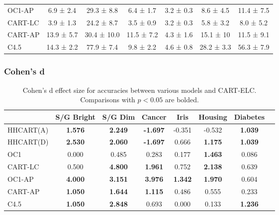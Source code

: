 \documentclass[10pt]{beamer}
\begin{document}
\begin{frame}
\begin{table}[h]
\begin{tabular}{lcccccc}
		OC1-AP    & 6.9 ± 2.4  & 29.3 ± 8.8  & 6.4 ± 1.7  & 3.2 ± 0.3  & 8.6 ± 4.5  & 11.4 ± 7.5  \\
		CART-LC   & 3.9 ± 1.3  & 24.2 ± 8.7  & 3.5 ± 0.9  & 3.2 ± 0.3  & 5.8 ± 3.2  & 8.0 ± 5.2  \\
		CART-AP   & 13.9 ± 5.7  & 30.4 ± 10.0  & 11.5 ± 7.2  & 4.3 ± 1.6  & 15.1 ± 10  & 11.5 ± 9.1  \\
		C4.5      & 14.3 ± 2.2  & 77.9 ± 7.4  & 9.8 ± 2.2  & 4.6 ± 0.8  & 28.2 ± 3.3  & 56.3 ± 7.9  \\ 
		\bottomrule
	\end{tabular}
	\label{fig:results}
\end{table}
\end{frame}

\begin{frame}
	\frametitle{Cohen's d}
	\tiny

\begin{table}[h]
	\centering
	\caption{Cohen's d effect size for accuracies between various models and CART-ELC. Comparisons with $p < 0.05$ are bolded.}
	\begin{tabular}{lccccccc} 
		\addlinespace
		\toprule
		\multirow{1}{*}{Algorithm} & \multirow{1}{*}{S/G Bright} & \multirow{1}{*}{S/G Dim} & \multirow{1}{*}{Cancer} & \multirow{1}{*}{Iris} & \multirow{1}{*}{Housing} & \multirow{1}{*}{Diabetes} \\ 
		\midrule

		HHCART(A) & \textbf{1.576} & \textbf{2.249} & \textbf{-1.697} & -0.351 & -0.532 & \textbf{1.039} \\
		HHCART(D) & \textbf{2.530} & \textbf{2.060} & \textbf{-1.697} & 0.666 & \textbf{1.175} & \textbf{1.039} \\
	OC1 & 0.000 & 0.485 & 0.283 & 0.177 & \textbf{1.463} & 0.086 \\
	CART-LC & 0.500 & \textbf{4.800} & \textbf{1.961} & 0.752 & \textbf{2.138} & 0.639 \\

	OC1-AP & \textbf{4.000} & \textbf{3.151} & \textbf{3.976} & \textbf{1.342} & \textbf{1.970} & 0.604 \\
	CART-AP & \textbf{1.050} & \textbf{1.644} & \textbf{1.115} & 0.486 & 0.555 & 0.233 \\
	C4.5 & \textbf{1.050} & \textbf{2.848} & 0.693 & 0.000 & 0.133 & \textbf{1.236} \\
    \bottomrule
\end{tabular}
\label{fig:cohens_d}
\end{table}
\end{frame}
\end{document}
